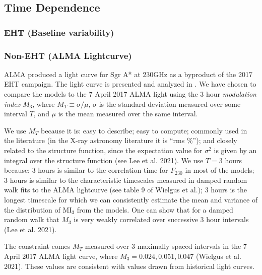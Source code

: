 \subsection{Time Dependence}

\subsubsection{EHT (Baseline variability)}



\subsubsection{Non-EHT (ALMA Lightcurve)}

ALMA produced a light curve for Sgr A* at 230GHz as a byproduct of the 2017 EHT campaign.  The light curve is presented and analyzed in \cite{wielgus2021}. We have chosen to compare the models to the 7 April 2017 ALMA light using the 3 hour {\em modulation index} $M_3$, where $M_T \equiv \sigma/\mu$, $\sigma$ is the standard deviation measured over some interval $T$, and $\mu$ is the mean measured over the same interval.  

We use $M_T$ because it is: easy to describe; easy to compute; commonly used in the literature (in the X-ray astronomy literature it is ``rms \%''); and closely related to the structure function, since the expectation value for $\sigma^2$ is given by an integral over the structure function (see Lee et al. 2021).  We use $T = 3$ hours because: 3 hours is similar to the correlation time for $F_{230}$ in most of the models; 3 hours is similar to the characteristic timescales measured in damped random walk fits to the ALMA lightcurve (see table 9 of Wielgus et al.); 3 hours is the longest timescale for which we can consistently estimate the mean and variance of the distribution of MI$_3$ from the models.  One can show that for a damped random walk that $M_3$ is very weakly correlated over successive 3 hour intervals (Lee et al. 2021).

The constraint comes $M_T$ measured over 3 maximally spaced intervals in the 7 April 2017 ALMA light curve, where $M_3 = 0.024, 0.051, 0.047$ (Wielgus et al. 2021).  These values are consistent with values drawn from historical light curves.
